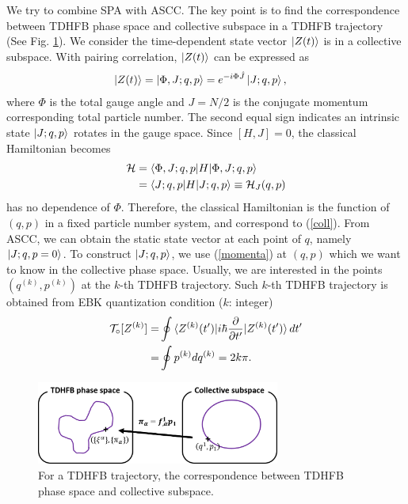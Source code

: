 \documentclass[%
superscriptaddress,
showpacs,
nofootinbib,
amsmath,amssymb,
aps,
prc,
twocolumn,
floatfix ]%
{revtex4-1}
\begin{document}
We try to combine SPA with ASCC. The key point is to find the correspondence between TDHFB phase space and collective subspace in a TDHFB trajectory (See Fig. \ref{correspondence}). We consider the time-dependent state vector $\ket{Z(t)}$ is in a collective subspace. With pairing correlation, $\ket{Z(t)}$ can be expressed as
\begin{align}
 \ket{Z(t)} &= \ket{\Phi,J;q,p} = e^{-i\Phi \hat{J}} \ket{J;q,p} ,
 \label{GCS}
\end{align}
where $\Phi$ is the total gauge angle and $J=N/2$ is the conjugate momentum corresponding total particle number. The second equal sign indicates an intrinsic state $\ket{J;q,p}$ rotates in the gauge space. Since $[H,J]=0$, the classical Hamiltonian 
becomes
\begin{align}
 \mathcal{H} &= \braket{\Phi,J;q,p|H|\Phi,J;q,p} \nonumber \\
 &= \braket{J;q,p|H|J;q,p} \equiv \mathcal{H}_J(q,p)
\end{align}  
has no dependence of $\Phi$. Therefore, the classical Hamiltonian is the function of $(q,p)$ in a fixed particle number system, and correspond to (\ref{coll}). From ASCC, we can obtain the static state vector at each point of $q$, namely $\ket{J;q,p=0}$. To construct $\ket{J;q,p}$, we use (\ref{momenta}) at $(q,p)$ which we want to know in the collective phase space. Usually, we are interested in the points $(q^{(k)},p^{(k)})$ at the $k$-th TDHFB trajectory. Such $k$-th TDHFB trajectory is obtained from EBK quantization condition ($k$: integer)
\begin{align}
	\mathcal{T}_\circ[Z^{(k)}]=&
	\oint \braket{Z^{(k)}(t')| i\hbar\frac{\partial}{\partial t'} |Z^{(k)}(t')} dt' \nonumber \\
	=& \oint p^{(k)} dq^{(k)} = 2k\pi .
	\label{EBK}
\end{align}

\begin{figure}[htbp]
 \begin{center}
    \includegraphics[width=80mm, bb=0 0 550 180]{SPA.png}
 \end{center}
  \caption{For a TDHFB trajectory, the correspondence between TDHFB phase space and collective subspace.}
  \label{correspondence}
\end{figure}
\end{document}
